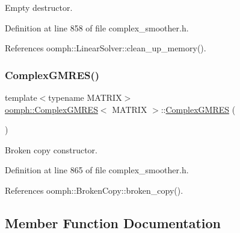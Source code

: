 Empty destructor. 



Definition at line 858 of file complex\+\_\+smoother.\+h.



References oomph\+::\+Linear\+Solver\+::clean\+\_\+up\+\_\+memory().

\mbox{\label{classoomph_1_1ComplexGMRES_a834e97a93d141ece73e4f3aac2e8cd00}} 
\subsubsection{\texorpdfstring{Complex\+G\+M\+R\+E\+S()}{ComplexGMRES()}\hspace{0.1cm}{\footnotesize\ttfamily [2/2]}}
{\footnotesize\ttfamily template$<$typename M\+A\+T\+R\+IX$>$ \\
\hyperlink{classoomph_1_1ComplexGMRES}{oomph\+::\+Complex\+G\+M\+R\+ES}$<$ M\+A\+T\+R\+IX $>$\+::\hyperlink{classoomph_1_1ComplexGMRES}{Complex\+G\+M\+R\+ES} (\begin{DoxyParamCaption}\item[{const \hyperlink{classoomph_1_1ComplexGMRES}{Complex\+G\+M\+R\+ES}$<$ M\+A\+T\+R\+IX $>$ \&}]{ }\end{DoxyParamCaption})\hspace{0.3cm}{\ttfamily [inline]}}



Broken copy constructor. 



Definition at line 865 of file complex\+\_\+smoother.\+h.



References oomph\+::\+Broken\+Copy\+::broken\+\_\+copy().



\subsection{Member Function Documentation}
\mbox{\label{classoomph_1_1ComplexGMRES_a8aa80ff477c4b131f8c1a4c74f872df1}} 
